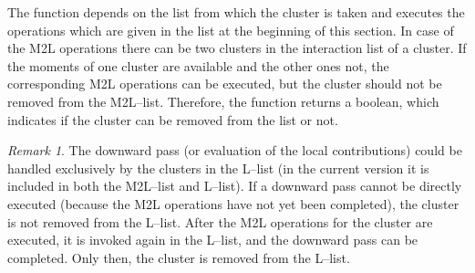 \documentclass[a4paper,11pt]{article}
\theoremstyle{plain}
\theoremstyle{definition}
\theoremstyle{remark}
\newtheorem{remark}[thm]{Remark}
\begin{document}
The function  depends on the list from which the cluster is taken and executes the operations which are given in the list at the beginning of this section. In case of the M2L operations there can be two clusters in the interaction list of a cluster. If the moments of one cluster are available and the other ones not, the corresponding M2L operations can be executed, but the cluster should not be removed from the M2L--list. Therefore, the function  returns a boolean, which indicates if the cluster can be removed from the list or not. 

\begin{remark}
  The downward pass (or evaluation of the local contributions) could be handled exclusively by the clusters in the L--list (in the current version it is included in both the M2L--list and L--list). If a downward pass cannot be directly executed (because the M2L operations have not yet been completed), the cluster is not removed from the L--list. After the M2L operations for the cluster are executed, it is invoked again in the L--list, and the downward pass can be completed. Only then, the cluster is removed from the L--list.
\end{remark}
\end{document}
